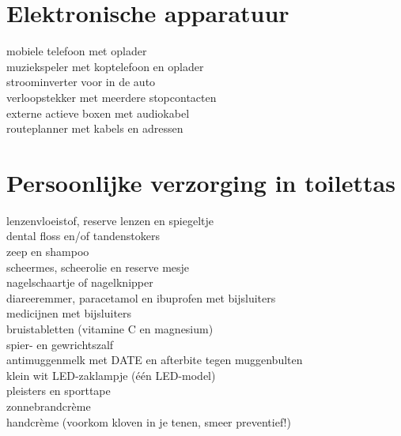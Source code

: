 \documentclass[9pt,twocolumn]{memoir}
\begin{document}
\section*{Elektronische apparatuur}
mobiele telefoon met oplader\\
muziekspeler met koptelefoon en oplader\\
stroominverter voor in de auto\\
verloopstekker met meerdere stopcontacten\\
externe actieve boxen met audiokabel\\
routeplanner met kabels en adressen

\section*{Persoonlijke verzorging in toilettas}
lenzenvloeistof, reserve lenzen en spiegeltje\\
dental floss en/of tandenstokers\\
zeep en shampoo\\
scheermes, scheerolie en reserve mesje\\
nagelschaartje of nagelknipper\\
diareeremmer, paracetamol en ibuprofen met bijsluiters\\
medicijnen met bijsluiters\\
bruistabletten (vitamine C en magnesium)\\
spier- en gewrichtszalf\\
antimuggenmelk met DATE en afterbite tegen muggenbulten\\
klein wit LED-zaklampje (één LED-model)\\
pleisters en sporttape\\
zonnebrandcrème\\
handcrème (voorkom kloven in je tenen, smeer preventief!)
\end{document}
